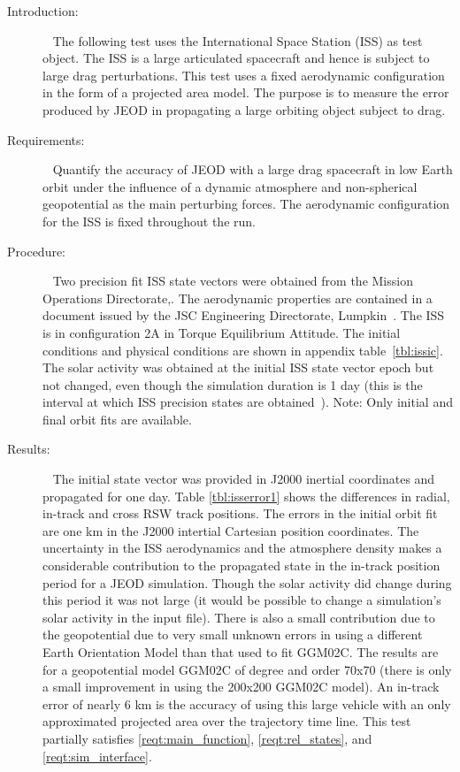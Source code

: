 \label{test:iss}
\begin{description}
\item[Introduction:] \ \newline
The following test uses the International Space Station (ISS) as test object.  The ISS
is a large articulated spacecraft and hence is subject to large drag perturbations. This
test uses a fixed aerodynamic configuration in the form of a projected area model.  The
purpose is to measure the error produced by JEOD in propagating a large orbiting object
subject to drag.
\item[Requirements:] \ \newline
Quantify the accuracy of JEOD with a large drag spacecraft in low Earth orbit under the
influence of a dynamic atmosphere and non-spherical geopotential as the main perturbing
forces. The aerodynamic configuration for the ISS is fixed throughout the run.
\item[Procedure:]\ \newline
Two precision fit ISS state vectors were obtained from the Mission Operations Directorate,\cite{topo}.
The aerodynamic properties are contained in a document issued by the JSC Engineering
Directorate, Lumpkin~\cite{iss}.  The ISS is in configuration 2A in Torque Equilibrium Attitude.
The initial conditions and physical conditions are shown in appendix table~\ref{tbl:issic}.
The solar activity was obtained at the initial ISS state vector epoch but not changed, even
though the simulation duration is 1 day (this is the interval at which ISS precision states are
obtained~\cite{topo}). Note: Only initial and final orbit fits are available.
\item[Results:]\ \newline
The initial state vector was provided in J2000 inertial coordinates and propagated for one day.
Table \ref{tbl:isserror1} shows the differences in radial, in-track and cross RSW track positions.
The errors in the initial orbit fit are one km in the J2000 intertial Cartesian position coordinates.
The uncertainty in the ISS aerodynamics and the atmosphere density makes a considerable contribution
to the propagated state in the in-track position period for a JEOD simulation.  Though the solar
activity did change during this period it was not large (it would be possible to change a simulation's
solar activity in the input file).  There is also a small contribution due to the geopotential due to
very small unknown errors in using a different Earth Orientation Model than that used to fit GGM02C.
The results are for a geopotential model GGM02C of degree and order 70x70 (there is only a small improvement
in using the 200x200 GGM02C model).  An in-track error of nearly 6 km is the accuracy of using this large
vehicle with an only approximated projected area over the trajectory time line.  This test partially
satisfies \ref{reqt:main_function}, \ref{reqt:rel_states}, and \ref{reqt:sim_interface}.


\end{description}
